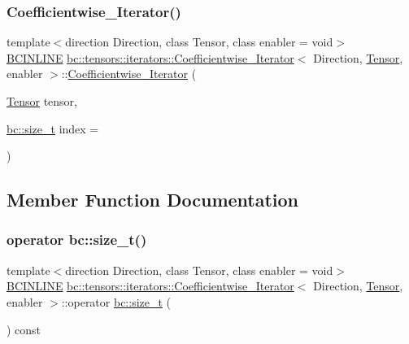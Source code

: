 \subsubsection{\texorpdfstring{Coefficientwise\+\_\+\+Iterator()}{Coefficientwise\_Iterator()}}
{\footnotesize\ttfamily template$<$direction Direction, class Tensor, class enabler = void$>$ \\
\hyperlink{common_8h_a6699e8b0449da5c0fafb878e59c1d4b1}{B\+C\+I\+N\+L\+I\+NE} \hyperlink{structbc_1_1tensors_1_1iterators_1_1Coefficientwise__Iterator}{bc\+::tensors\+::iterators\+::\+Coefficientwise\+\_\+\+Iterator}$<$ Direction, \hyperlink{namespacebc_a659391e47ab612be3ba6c18cf9c89159}{Tensor}, enabler $>$\+::\hyperlink{structbc_1_1tensors_1_1iterators_1_1Coefficientwise__Iterator}{Coefficientwise\+\_\+\+Iterator} (\begin{DoxyParamCaption}\item[{\hyperlink{namespacebc_a659391e47ab612be3ba6c18cf9c89159}{Tensor}}]{tensor,  }\item[{\hyperlink{namespacebc_aaf8e3fbf99b04b1b57c4f80c6f55d3c5}{bc\+::size\+\_\+t}}]{index = {} }\end{DoxyParamCaption})\hspace{0.3cm}{\ttfamily [inline]}}



\subsection{Member Function Documentation}
\mbox{\label{structbc_1_1tensors_1_1iterators_1_1Coefficientwise__Iterator_ab0653f42585a433a4b4da90e89cb651c}} 
\subsubsection{\texorpdfstring{operator bc\+::size\+\_\+t()}{operator bc::size\_t()}}
{\footnotesize\ttfamily template$<$direction Direction, class Tensor, class enabler = void$>$ \\
\hyperlink{common_8h_a6699e8b0449da5c0fafb878e59c1d4b1}{B\+C\+I\+N\+L\+I\+NE} \hyperlink{structbc_1_1tensors_1_1iterators_1_1Coefficientwise__Iterator}{bc\+::tensors\+::iterators\+::\+Coefficientwise\+\_\+\+Iterator}$<$ Direction, \hyperlink{namespacebc_a659391e47ab612be3ba6c18cf9c89159}{Tensor}, enabler $>$\+::operator \hyperlink{namespacebc_aaf8e3fbf99b04b1b57c4f80c6f55d3c5}{bc\+::size\+\_\+t} (\begin{DoxyParamCaption}{ }\end{DoxyParamCaption}) const\hspace{0.3cm}{\ttfamily [inline]}}

